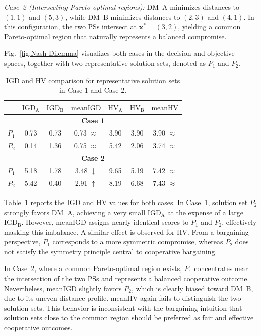 \documentclass[journal]{IEEEtran}
\begin{document}
\textit{Case~2 (Intersecting Pareto-optimal regions):}  
DM~A minimizes distances to $(1,1)$ and $(5,3)$, while DM~B minimizes distances to $(2,3)$ and $(4,1)$. In this configuration, the two PSs intersect at $\mathbf{x}^*=(3,2)$, yielding a common Pareto-optimal region that naturally represents a balanced compromise.

Fig.~\ref{fig:Nash Dilemma} visualizes both cases in the decision and objective spaces, together with two representative solution sets, denoted as $P_1$ and $P_2$.

\begin{table}[htbp]
	\centering
	\caption{IGD and HV comparison for representative solution sets in Case 1 and Case 2.}
	\label{tab:case1_case2_comparison}
	\small
	\setlength{\tabcolsep}{4pt}
	\begin{tabular}{lcccccc}
		\toprule
		& $\mathrm{IGD_A}$ & $\mathrm{IGD_B}$ & $\mathrm{meanIGD}$ & $\mathrm{HV_A}$ & $\mathrm{HV_B}$ & $\mathrm{meanHV}$ \\
		\midrule
		
		\multicolumn{7}{c}{\textbf{Case 1}} \\
		$P_1$ & 0.73 & 0.73 & 0.73 $\approx$ & 3.90 & 3.90 & 3.90 $\approx$ \\
		$P_2$ & 0.14 & 1.36 & 0.75 $\approx$ & 5.42 & 2.06 & 3.74 $\approx$ \\
		
		\midrule
		\multicolumn{7}{c}{\textbf{Case 2}} \\
		$P_1$ & 5.18 & 1.78 & 3.48 $\downarrow$ & 9.65 & 5.19 & 7.42 $\approx$ \\
		$P_2$ & 5.42 & 0.40 & 2.91 $\uparrow$ & 8.19 & 6.68 & 7.43 $\approx$ \\
		
		\bottomrule
	\end{tabular}
\end{table}

Table~\ref{tab:case1_case2_comparison} reports the IGD and HV values for both cases. In Case~1, solution set $P_2$ strongly favors DM~A, achieving a very small $\mathrm{IGD_A}$ at the expense of a large $\mathrm{IGD_B}$. However, meanIGD assigns nearly identical scores to $P_1$ and $P_2$, effectively masking this imbalance. A similar effect is observed for HV. From a bargaining perspective, $P_1$ corresponds to a more symmetric compromise, whereas $P_2$ does not satisfy the symmetry principle central to cooperative bargaining.

In Case~2, where a common Pareto-optimal region exists, $P_1$ concentrates near the intersection of the two PSs and represents a balanced cooperative outcome. Nevertheless, meanIGD slightly favors $P_2$, which is clearly biased toward DM~B, due to its uneven distance profile. meanHV again fails to distinguish the two solution sets. This behavior is inconsistent with the bargaining intuition that solution sets close to the common region should be preferred as fair and effective cooperative outcomes.
\end{document}
